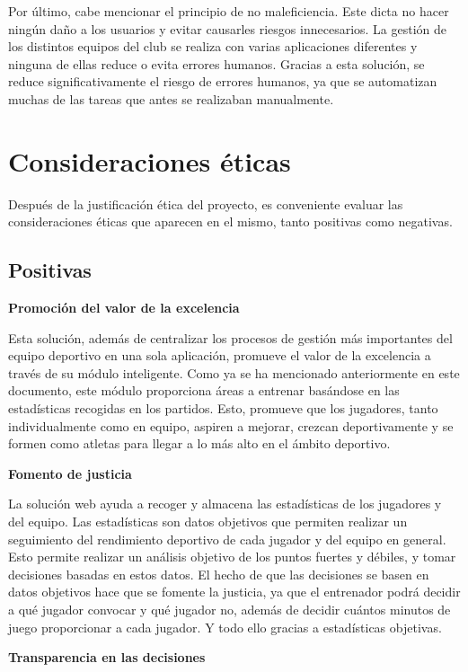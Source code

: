 Por último, cabe mencionar el principio de no maleficiencia. Este dicta no hacer ningún daño a los usuarios y evitar causarles riesgos innecesarios. La gestión de los distintos equipos del club se realiza con varias aplicaciones diferentes y ninguna de ellas reduce o evita errores humanos. Gracias a esta solución, se reduce significativamente el riesgo de errores humanos, ya que se automatizan muchas de las tareas que antes se realizaban manualmente.

\section{Consideraciones éticas}

Después de la justificación ética del proyecto, es conveniente evaluar las consideraciones éticas que aparecen en el mismo, tanto positivas como negativas.

\subsection{Positivas}

\textbf{Promoción del valor de la excelencia}

Esta solución, además de centralizar los procesos de gestión más importantes del equipo deportivo en una sola aplicación, promueve el valor de la excelencia a través de su módulo inteligente. Como ya se ha mencionado anteriormente en este documento, este módulo proporciona áreas a entrenar basándose en las estadísticas recogidas en los partidos. Esto, promueve que los jugadores, tanto individualmente como en equipo, aspiren a mejorar, crezcan deportivamente y se formen como atletas para llegar a lo más alto en el ámbito deportivo.

\textbf{Fomento de justicia}

La solución web ayuda a recoger y almacena las estadísticas de los jugadores y del equipo. Las estadísticas son datos objetivos que permiten realizar un seguimiento del rendimiento deportivo de cada jugador y del equipo en general. Esto permite realizar un análisis objetivo de los puntos fuertes y débiles, y tomar decisiones basadas en estos datos. El hecho de que las decisiones se basen en datos objetivos hace que se fomente la justicia, ya que el entrenador podrá decidir a qué jugador convocar y qué jugador no, además de decidir cuántos minutos de juego proporcionar a cada jugador. Y todo ello gracias a estadísticas objetivas.

\textbf{Transparencia en las decisiones}

